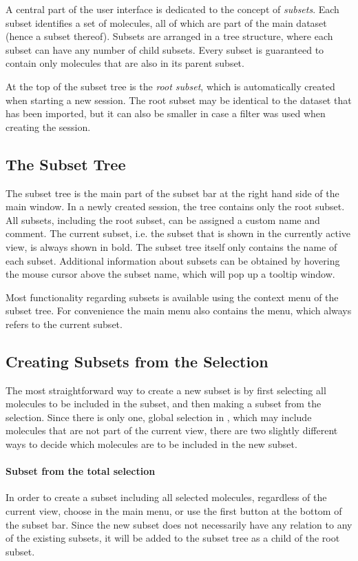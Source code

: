 A central part of the \sh user interface is dedicated to the concept of \emph{subsets}.
Each subset identifies a set of molecules, all of which are part of the main dataset (hence a subset thereof).
Subsets are arranged in a tree structure, where each subset can have any number of child subsets.
Every subset is guaranteed to contain only molecules that are also in its parent subset.

At the top of the subset tree is the \emph{root subset}, which is automatically created when starting a new \sh session.
The root subset may be identical to the dataset that has been imported, but it can also be smaller in case a filter was used when creating the session.


\subsection{The Subset Tree}

The subset tree is the main part of the subset bar at the right hand side of the \sh main window.
In a newly created session, the tree contains only the root subset.
All subsets, including the root subset, can be assigned a custom name and comment.
The current subset, i.e. the subset that is shown in the currently active view, is always shown in bold.
The subset tree itself only contains the name of each subset.
Additional information about subsets can be obtained by hovering the mouse cursor above the subset name, which will pop up a tooltip window.

Most functionality regarding subsets is available using the context menu of the subset tree.
For convenience the main menu also contains the  menu, which always refers to the current subset.


\subsection{Creating Subsets from the Selection}
The most straightforward way to create a new subset is by first selecting all molecules to be included in the subset, and then making a subset from the selection.
Since there is only one, global selection in \sh, which may include molecules that are not part of the current view, there are two slightly different ways to decide which molecules are to be included in the new subset.

\paragraph{Subset from the total selection}
In order to create a subset including all selected molecules, regardless of the current view, choose  in the main menu, or use the first  button at the bottom of the subset bar.
Since the new subset does not necessarily have any relation to any of the existing subsets, it will be added to the subset tree as a child of the root subset.

